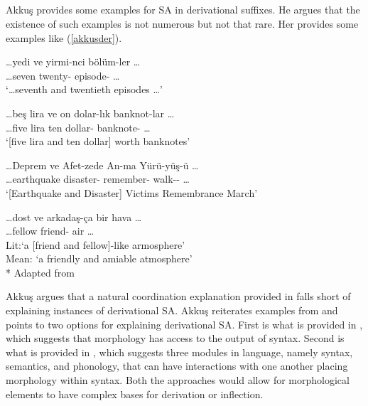 \subsection{\cite{akkucs2016suspended}}

Akkuş provides some examples for SA in derivational suffixes. He argues that the existence of such examples is not numerous but not that rare. Her provides some examples like (\ref{akkusder}).

\begin{exe}
\ex \label{akkusder}
\begin{xlist}
    \ex \gll \ldots yedi ve yirmi-nci bölüm-ler \ldots \\ 
    \ldots seven {\And} twenty-{\Der} episode-{\Pl} \ldots \\
    \glt `\ldots seventh and twentieth episodes \ldots'
    
    \ex \gll \ldots beş lira ve on dolar-lık banknot-lar \ldots \\
    \ldots five lira {\And} ten dollar-{\Der} banknote-{\Pl} \ldots \\
    \glt `[five lira and ten dollar] worth banknotes'
    
    \ex \gll \ldots Deprem ve Afet-zede An-ma Yürü-yüş-ü \ldots \\ \ldots earthquake {\And} disaster-{\Der} remember-{\Nmlz} walk-{\Nmlz}-{\Acc} \ldots \\ 
    \glt `[Earthquake and Disaster] Victims Remembrance March'
    
    \ex \gll \ldots dost ve arkadaş-ça bir hava \ldots \\ \ldots fellow {\And} friend-{\Der} {\Det} air \ldots \\
    \glt Lit:`a [friend and fellow]-like armosphere' \\ Mean: `a friendly and amiable atmosphere'\\*
    \hfill Adapted from \cite{akkucs2016suspended}
\end{xlist}
\end{exe}

Akkuş argues that a natural coordination explanation \citep{walchli2005co} provided in \cite{kabak2007turkish} falls short of explaining instances of derivational SA. Akkuş reiterates examples from \cite{ackema2004beyond, lieber2006lexical} and points to two options for explaining derivational SA. First is what is provided in \cite{lieber2006lexical}, which suggests that morphology has access to the output of syntax. Second is what is provided in \cite{ackema2004beyond}, which suggests three modules in language, namely syntax, semantics, and phonology, that can have interactions with one another placing morphology within syntax. Both the approaches would allow for morphological elements to have complex bases for derivation or inflection.
